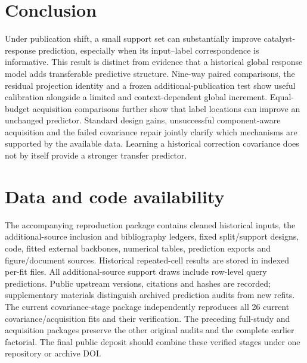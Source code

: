 \documentclass[11pt]{article}
\begin{document}
\section{Conclusion}
Under publication shift, a small support set can substantially improve catalyst-response prediction, especially when its input--label correspondence is informative. This result is distinct from evidence that a historical global response model adds transferable predictive structure. Nine-way paired comparisons, the residual projection identity and a frozen additional-publication test show useful calibration alongside a limited and context-dependent global increment. Equal-budget acquisition comparisons further show that label locations can improve an unchanged predictor. Standard design gains, unsuccessful component-aware acquisition and the failed covariance repair jointly clarify which mechanisms are supported by the available data. Learning a historical correction covariance does not by itself provide a stronger transfer predictor.

\section*{Data and code availability}
The accompanying reproduction package contains cleaned historical inputs, the additional-source inclusion and bibliography ledgers, fixed split/support designs, code, fitted external backbones, numerical tables, prediction exports and figure/document sources. Historical repeated-cell results are stored in indexed per-fit files. All additional-source support draws include row-level query predictions. Public upstream versions, citations and hashes are recorded; supplementary materials distinguish archived prediction audits from new refits. The current covariance-stage package independently reproduces all 26 current covariance/acquisition fits and their verification. The preceding full-study and acquisition packages preserve the other original audits and the complete earlier factorial. The final public deposit should combine these verified stages under one repository or archive DOI.


\end{document}
